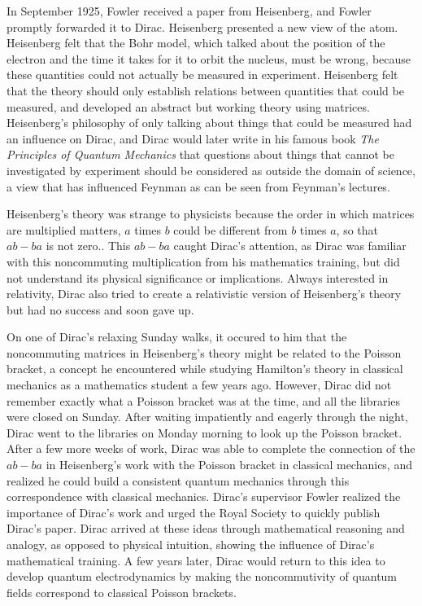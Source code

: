 \documentclass[12pt, oneside, letterpaper, fleqn]{article}
\begin{document}
In September 1925, Fowler received a paper from Heisenberg, and Fowler
promptly forwarded it to Dirac. Heisenberg presented a new view of the
atom. Heisenberg felt that the Bohr model, which talked about the
position of the electron and the time it takes for it to orbit the
nucleus, must be wrong, because these quantities could not actually be
measured in experiment. Heisenberg felt that the theory should only
establish relations between quantities that could be measured, and
developed an abstract but working theory using matrices. Heisenberg's
philosophy of only talking about things that could be measured had an
influence on Dirac, and Dirac would later write in his famous book
\textit{The Principles of Quantum Mechanics} \cite{principles} that
questions about things that cannot be investigated by experiment should
be considered as outside the domain of science, a view that has
influenced Feynman as can be seen from Feynman's lectures.

Heisenberg's theory was strange to physicists because the order in which
matrices are multiplied matters, $a$ times $b$ could be different from
$b$ times $a$, so that $ab - ba$ is not zero..  This $ab - ba$ caught
Dirac's attention, as Dirac was familiar with this noncommuting
multiplication from his mathematics training, but did not understand its
physical significance or implications. Always interested in relativity,
Dirac also tried to create a relativistic version of Heisenberg's theory
but had no success and soon gave up.

On one of Dirac's relaxing Sunday walks, it occured to him that the
noncommuting matrices in Heisenberg's theory might be related to the
Poisson bracket, a concept he encountered while studying Hamilton's
theory in classical mechanics as a mathematics student a few years ago.
However, Dirac did not remember exactly what a Poisson bracket was at
the time, and all the libraries were closed on Sunday. After waiting
impatiently and eagerly through the night, Dirac went to the libraries
on Monday morning to look up the Poisson bracket. After a few more weeks
of work, Dirac was able to complete the connection of the $ab - ba$ in
Heisenberg's work with the Poisson bracket in classical mechanics, and
realized he could build a consistent quantum mechanics through this
correspondence with classical mechanics. Dirac's supervisor Fowler
realized the importance of Dirac's work and urged the Royal Society to
quickly publish Dirac's paper. Dirac arrived at these ideas through
mathematical reasoning and analogy, as opposed to physical intuition,
showing the influence of Dirac's mathematical training. A few years
later, Dirac would return to this idea to develop quantum
electrodynamics by making the noncommutivity of quantum fields
correspond to classical Poisson brackets.
\end{document}
